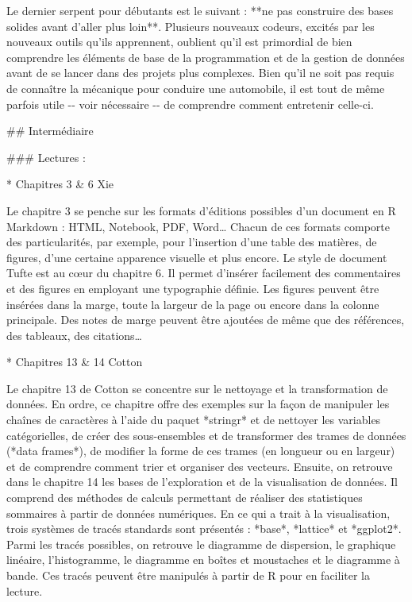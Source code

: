 \documentclass[
  letterpaper,
]{scrbook}
\begin{document}
Le dernier serpent pour débutants est le suivant : **ne pas construire
des bases solides avant d'aller plus loin**. Plusieurs nouveaux codeurs,
excités par les nouveaux outils qu'ils apprennent, oublient qu'il est
primordial de bien comprendre les éléments de base de la programmation
et de la gestion de données avant de se lancer dans des projets plus
complexes. Bien qu'il ne soit pas requis de connaître la mécanique pour
conduire une automobile, il est tout de même parfois utile -\/- voir
nécessaire -\/- de comprendre comment entretenir celle-ci.

\#\# Intermédiaire

\#\#\# Lectures :

* Chapitres 3 \& 6 Xie

Le chapitre 3 se penche sur les formats d'éditions possibles d'un
document en R Markdown : HTML, Notebook, PDF, Word\ldots{} Chacun de ces
formats comporte des particularités, par exemple, pour l'insertion d'une
table des matières, de figures, d'une certaine apparence visuelle et
plus encore. Le style de document Tufte est au cœur du chapitre 6. Il
permet d'insérer facilement des commentaires et des figures en employant
une typographie définie. Les figures peuvent être insérées dans la
marge, toute la largeur de la page ou encore dans la colonne principale.
Des notes de marge peuvent être ajoutées de même que des références, des
tableaux, des citations\ldots{}

* Chapitres 13 \& 14 Cotton

Le chapitre 13 de Cotton se concentre sur le nettoyage et la
transformation de données. En ordre, ce chapitre offre des exemples sur
la façon de manipuler les chaînes de caractères à l'aide du paquet
*stringr* et de nettoyer les variables catégorielles, de créer des
sous-ensembles et de transformer des trames de données (*data frames*),
de modifier la forme de ces trames (en longueur ou en largeur) et de
comprendre comment trier et organiser des vecteurs. Ensuite, on retrouve
dans le chapitre 14 les bases de l'exploration et de la visualisation de
données. Il comprend des méthodes de calculs permettant de réaliser des
statistiques sommaires à partir de données numériques. En ce qui a trait
à la visualisation, trois systèmes de tracés standards sont présentés :
*base*, *lattice* et *ggplot2*. Parmi les tracés possibles, on retrouve
le diagramme de dispersion, le graphique linéaire, l'histogramme, le
diagramme en boîtes et moustaches et le diagramme à bande. Ces tracés
peuvent être manipulés à partir de R pour en faciliter la lecture.
\end{document}
